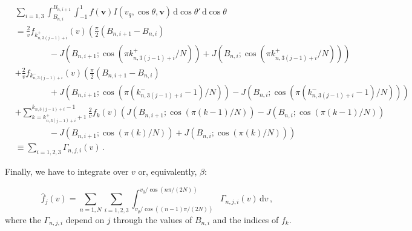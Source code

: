 \begin{align*}
& \sum_{i = 1,3}\int_{B_{n,i}}^{B_{n,i+1}} \int_{-1}^{1} f(\textbf{v}) I(v_q, \cos\theta, \textbf{v}) \, \mathrm{d}\cos\theta' \, \mathrm{d}\cos\theta\\
&= \frac{2}{v} f_{k_{n,3(j-1)+i}^+}(v) \left( \frac{\pi}{2}(B_{n,i+1} - B_{n,i}) \right.\\
&\qquad\qquad - \left.J(B_{n,i+1}; \cos(\pi k_{n,3(j-1)+i}^{+}/N)) + J(B_{n,i}; \cos(\pi k_{n,3(j-1)+i}^{+}/N))\right)\\
&+ \frac{2}{v} f_{k_{n,3(j-1)+i}^-}(v) \left( \frac{\pi}{2}(B_{n,i+1} - B_{n,i})\right. \\
&\qquad\qquad + \left. J(B_{n,i+1}; \cos(\pi (k_{n,3(j-1)+i}^{-}-1)/N)) - J(B_{n,i}; \cos(\pi (k_{n,3(j-1)+i}^{-}-1)/N))\right)\\
&+ \sum_{k = k_{n,3(j-1)+i}^+ +1}^{k_{n,3(j-1)+i}-1} \frac{2}{v} f_{k}(v) \left( J(B_{n,i+1};\cos(\pi (k-1)/N)) - J(B_{n,i};\cos(\pi (k-1)/N))\right. \\
&\qquad\qquad - \left. J(B_{n,i+1};\cos(\pi (k)/N)) + J(B_{n,i};\cos(\pi (k)/N)) \right)\\
&\equiv \sum_{i=1,2,3} \Gamma_{n,j,i}(v)\,.
\end{align*}

Finally, we have to integrate over $v$ or, equivalently, $\beta$:

\begin{equation}
\hat{f}_j(v) = \sum_{n = 1,N} \sum_{i=1,2,3} \int_{v_q/\cos((n-1)\pi/(2N))}^{v_q/\cos(n\pi/(2N))}  \Gamma_{n,j,i}(v) \, \mathrm{d}v\,,
\end{equation}
where the $\Gamma_{n,j,i}$ depend on $j$ through the values of $B_{n,i}$ and the indices of $f_k$.

